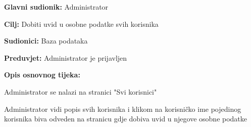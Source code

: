 					\noindent {}
					\begin{packed_item}
	
						\item \textbf{Glavni sudionik: }Administrator
						\item  \textbf{Cilj:} Dobiti uvid u osobne podatke svih korisnika
						\item  \textbf{Sudionici:} Baza podataka
						\item  \textbf{Preduvjet:} Administrator je prijavljen
						\item  \textbf{Opis osnovnog tijeka:}
						
						\item[] \begin{packed_enum}
	
							\item Administrator se nalazi na stranici "Svi korisnici"
							\item Administrator vidi popis svih korisnika i klikom na korisničko ime pojedinog korisnika biva odveden na stranicu gdje dobiva uvid u njegove osobne podatke
							
						\end{packed_enum}
						
					\end{packed_item}
					
